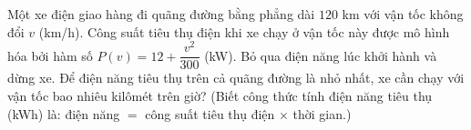 \begin{ex}
Một xe điện giao hàng đi quãng đường bằng phẳng dài $120$ km với vận tốc không đổi $v$ (km/h). Công suất tiêu thụ điện khi xe chạy ở vận tốc này được mô hình hóa bởi hàm số $P(v)=12+\dfrac{v^2}{300}$ (kW). Bỏ qua điện năng lúc khởi hành và dừng xe. Để điện năng tiêu thụ trên cả quãng đường là nhỏ nhất, xe cần chạy với vận tốc bao nhiêu kilômét trên giờ? (Biết công thức tính điện năng tiêu thụ (kWh) là: điện năng $=$ công suất tiêu thụ điện $\times$ thời gian.)
\end{ex}
